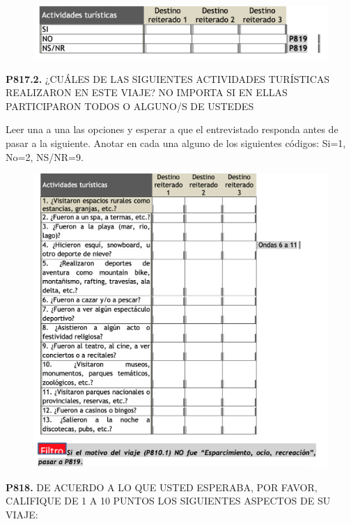 \documentclass[
  openany]{book}
\begin{document}
\begin{figure}

{\centering \includegraphics[width=1\linewidth]{imagenes/figura6-273} 

}

\end{figure}

\textbf{P817.2.} ¿CUÁLES DE LAS SIGUIENTES ACTIVIDADES TURÍSTICAS REALIZARON EN ESTE VIAJE? NO IMPORTA SI EN ELLAS PARTICIPARON TODOS O ALGUNO/S DE USTEDES

Leer una a una las opciones y esperar a que el entrevistado responda antes de pasar a la siguiente. Anotar en cada una alguno de los siguientes códigos: Si=1, No=2, NS/NR=9.

\begin{figure}

{\centering \includegraphics[width=1\linewidth]{imagenes/figura6-274} 

}

\end{figure}

\textbf{P818.} DE ACUERDO A LO QUE USTED ESPERABA, POR FAVOR, CALIFIQUE DE 1 A 10 PUNTOS LOS SIGUIENTES ASPECTOS DE SU VIAJE:
\end{document}
